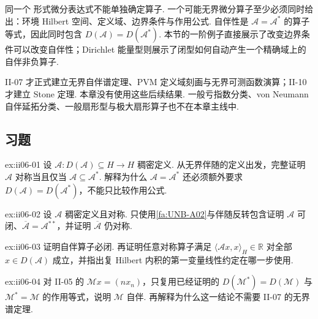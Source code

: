 \begin{FARemark}[边界条件与定义域治理]
同一个 形式微分表达式不能单独确定算子. 一个可能无界微分算子至少必须同时给出：环境 Hilbert 空间、定义域、边界条件与作用公式. 自伴性是 \(\displaystyle\mathcal A=\mathcal A^*\) 的算子等式，因此同时包含 \(\displaystyle D(\mathcal A)=D(\mathcal A^*)\). 本节的一阶例子直接展示了改变边界条件可以改变自伴性；Dirichlet 能量型则展示了闭型如何自动产生一个精确域上的自伴非负算子.
\end{FARemark}

\begin{FARemark}[后续理论边界]
II-07 才正式建立无界自伴谱定理、PVM 定义域刻画与无界可测函数演算；II-10 才建立 Stone 定理. 本章没有使用这些后续结果. 一般亏指数分类、von Neumann 自伴延拓分类、一般扇形型与极大扇形算子也不在本章主线中.
\end{FARemark}

\subsection*{习题}

\begin{FAExercise}[对称性与算子包含]{ex:ii06-01}
设 \(\displaystyle\mathcal A:D(\mathcal A)\subseteq H\to H\) 稠密定义. 从无界伴随的定义出发，完整证明 \(\displaystyle\mathcal A\) 对称当且仅当 \(\displaystyle\mathcal A\subseteq\mathcal A^*\). 解释为什么 \(\displaystyle\mathcal A=\mathcal A^*\) 还必须额外要求 \(\displaystyle D(\mathcal A)=D(\mathcal A^*)\)，不能只比较作用公式.
\end{FAExercise}

\begin{FAExercise}[对称算子的可闭性与闭包]{ex:ii06-02}
设 \(\displaystyle\mathcal A\) 稠密定义且对称. 只使用\autoref{fa:UNB-A02}与伴随反转包含证明 \(\displaystyle\mathcal A\) 可闭、\(\displaystyle\overline{\mathcal A}=\mathcal A^{**}\)，并证明 \(\displaystyle\overline{\mathcal A}\) 仍对称.
\end{FAExercise}

\begin{FAExercise}[自伴闭性与实二次值]{ex:ii06-03}
证明自伴算子必闭. 再证明任意对称算子满足 \(\displaystyle\langle\mathcal Ax,x\rangle_H\in\mathbb R\) 对全部 \(\displaystyle x\in D(\mathcal A)\) 成立，并指出复 Hilbert 内积的第一变量线性约定在哪一步使用.
\end{FAExercise}

\begin{FAExercise}[无界乘法算子模型的自伴复用]{ex:ii06-04}
对 II-05 的 \(\displaystyle\mathcal Mx=(nx_n)\)，只复用已经证明的 \(\displaystyle D(\mathcal M^*)=D(\mathcal M)\) 与 \(\displaystyle\mathcal M^*=\mathcal M\) 的作用等式，说明 \(\displaystyle\mathcal M\) 自伴. 再解释为什么这一结论不需要 II-07 的无界谱定理.
\end{FAExercise}


